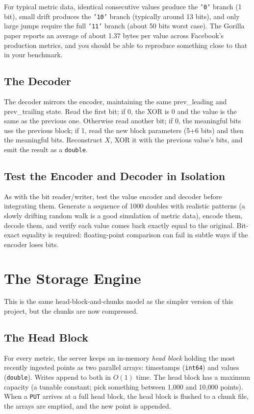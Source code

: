 \documentclass[11pt,a4paper]{article}
\begin{document}
For typical metric data, identical consecutive values produce the \texttt{'0'} branch (1 bit), small drift produces the \texttt{'10'} branch (typically around 13 bits), and only large jumps require the full \texttt{'11'} branch (about 50 bits worst case). The Gorilla paper reports an average of about 1.37 bytes per value across Facebook's production metrics, and you should be able to reproduce something close to that in your benchmark.

\subsection{The Decoder}
The decoder mirrors the encoder, maintaining the same prev\_leading and prev\_trailing state. Read the first bit; if 0, the XOR is 0 and the value is the same as the previous one. Otherwise read another bit; if 0, the meaningful bits use the previous block; if 1, read the new block parameters (5+6 bits) and then the meaningful bits. Reconstruct $X$, XOR it with the previous value's bits, and emit the result as a \texttt{double}.

\subsection{Test the Encoder and Decoder in Isolation}
As with the bit reader/writer, test the value encoder and decoder before integrating them. Generate a sequence of 1000 doubles with realistic patterns (a slowly drifting random walk is a good simulation of metric data), encode them, decode them, and verify each value comes back exactly equal to the original. Bit-exact equality is required: floating-point comparison can fail in subtle ways if the encoder loses bits.

\section{The Storage Engine}

This is the same head-block-and-chunks model as the simpler version of this project, but the chunks are now compressed.

\subsection{The Head Block}
For every metric, the server keeps an in-memory \textit{head block} holding the most recently ingested points as two parallel arrays: timestamps (\texttt{int64}) and values (\texttt{double}). Writes append to both in $O(1)$ time. The head block has a maximum capacity (a tunable constant; pick something between 1{,}000 and 10{,}000 points). When a \texttt{PUT} arrives at a full head block, the head block is flushed to a chunk file, the arrays are emptied, and the new point is appended.
\end{document}
